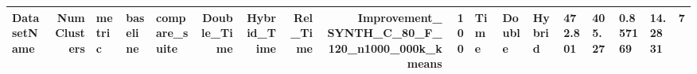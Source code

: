 \begin{tabular}{lrlllrrrrr}
\toprule
DatasetName & NumClusters & metric & baseline & compare_suite & Double_Time & Hybrid_Time & Rel_Time & Improvement_%
\midrule
SYNTH_C_80_F_120_n1000_000k_kmeans & 100 & Time & Double & Hybrid & 472.801 & 405.27 & 0.857169 & 14.2831 & 7 \\
\bottomrule
\end{tabular}

